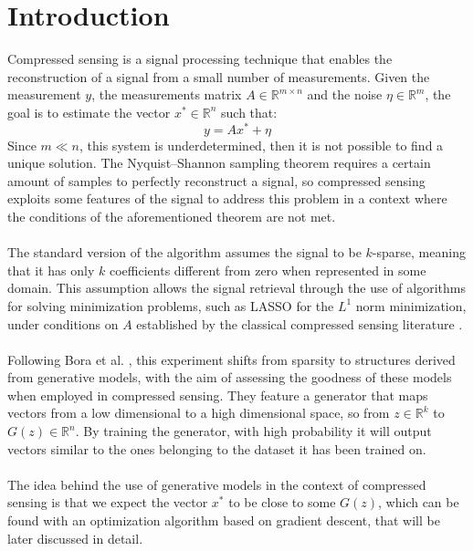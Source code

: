 \section{Introduction}
\vspace{1cm}
Compressed sensing is a signal processing technique that enables the reconstruction of a signal from a small number of measurements. Given the measurement $y$, the measurements matrix $A\in\mathbb{R}^{m\times n}$ and the noise $\eta\in\mathbb{R}^m$, the goal is to estimate the vector $x^*\in\mathbb{R}^n$ such that:
\begin{equation}
    y=Ax^*+\eta
\end{equation}
Since $m\ll n$, this system is underdetermined, then it is not possible to find a unique solution. The Nyquist--Shannon sampling theorem requires a certain amount of samples to perfectly reconstruct a signal, so compressed sensing exploits some features of the signal to address this problem in a context where the conditions of the aforementioned theorem are not met.
\\\\
The standard version of the algorithm assumes the signal to be $k$-sparse, meaning that it has only $k$ coefficients different from zero when represented in some domain. This assumption allows the signal retrieval through the use of algorithms for solving minimization problems, such as LASSO \cite{tibshirani1996} for the $L^1$ norm minimization, under conditions on $A$ established by the classical compressed sensing literature \cite{candes2006,donoho2006}.
\\\\
Following Bora et al. \cite{bora2017}, this experiment shifts from sparsity to structures derived from generative models, with the aim of assessing the goodness of these models when employed in compressed sensing. They feature a generator that maps vectors from  a low dimensional to a high dimensional space, so from $z\in\mathbb{R}^k$ to $G(z)\in\mathbb{R}^n$. By training the generator, with high probability it will output vectors similar to the ones belonging to the dataset it has been trained on.
\\\\
The idea behind the use of generative models in the context of compressed sensing is that we expect the vector $x^*$ to be close to some $G(z)$, which can be found with an optimization algorithm based on gradient descent, that will be later discussed in detail.